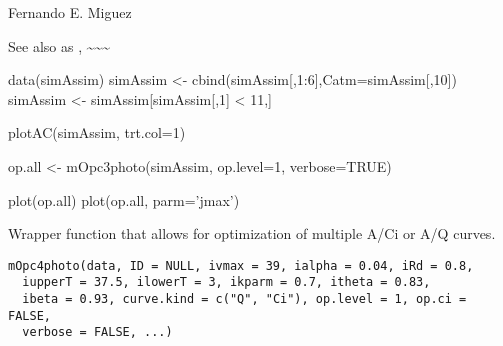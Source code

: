 \documentclass[letterpaper]{book}
\begin{document}
%
\begin{Author}\relax
Fernando E. Miguez
\end{Author}
%
\begin{SeeAlso}\relax
See also  
as , \textasciitilde{}\textasciitilde{}\textasciitilde{}
\end{SeeAlso}
%
\begin{Examples}
\begin{ExampleCode}
data(simAssim)
simAssim <- cbind(simAssim[,1:6],Catm=simAssim[,10])
simAssim <- simAssim[simAssim[,1] < 11,]

plotAC(simAssim, trt.col=1)

op.all <- mOpc3photo(simAssim, op.level=1,
                      verbose=TRUE)

plot(op.all)
plot(op.all, parm='jmax')
\end{ExampleCode}
\end{Examples}
%
\begin{Description}\relax
Wrapper function that allows for optimization of multiple
A/Ci or A/Q curves.
\end{Description}
%
\begin{Usage}
\begin{verbatim}
mOpc4photo(data, ID = NULL, ivmax = 39, ialpha = 0.04, iRd = 0.8,
  iupperT = 37.5, ilowerT = 3, ikparm = 0.7, itheta = 0.83,
  ibeta = 0.93, curve.kind = c("Q", "Ci"), op.level = 1, op.ci = FALSE,
  verbose = FALSE, ...)
\end{verbatim}
\end{Usage}
%
\end{document}
